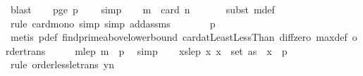 \begin{isabellebody}
\ blast\isanewline
\ \ \isamarkupfalse%
\ p{\isacharunderscore}{\kern0pt}ge{\isacharunderscore}{\kern0pt}{}{\isacharcolon}{\kern0pt}\ {\isachardoublequoteopen}p\ {\isachargreater}{\kern0pt}\ {}{\isachardoublequoteclose}\ \isamarkupfalse%
\ simp\isanewline
\isanewline
\ \ \isamarkupfalse%
\ {\isachardoublequoteopen}m\ {\isasymle}\ card\ {\isacharbraceleft}{\kern0pt}{}{\isachardot}{\kern0pt}{\isachardot}{\kern0pt}{\isacharless}{\kern0pt}n{\isacharbraceright}{\kern0pt}{\isachardoublequoteclose}\ \isanewline
\ \ \ \ \isamarkupfalse%
\ {\isacharparenleft}{\kern0pt}subst\ m{\isacharunderscore}{\kern0pt}def{\isacharparenright}{\kern0pt}\isanewline
\ \ \ \ \isamarkupfalse%
\ {\isacharparenleft}{\kern0pt}rule\ card{\isacharunderscore}{\kern0pt}mono{\isacharcomma}{\kern0pt}\ simp{\isacharcomma}{\kern0pt}\ simp\ add{\isacharcolon}{\kern0pt}assms{\isacharparenleft}{\kern0pt}{}{\isacharparenright}{\kern0pt}{\isacharparenright}{\kern0pt}\isanewline
\ \ \isamarkupfalse%
\ \isamarkupfalse%
\ {\isachardoublequoteopen}{\isachardot}{\kern0pt}{\isachardot}{\kern0pt}{\isachardot}{\kern0pt}\ {\isasymle}\ p{\isachardoublequoteclose}\isanewline
\ \ \ \ \isamarkupfalse%
\ {\isacharparenleft}{\kern0pt}metis\ p{\isacharunderscore}{\kern0pt}def\ find{\isacharunderscore}{\kern0pt}prime{\isacharunderscore}{\kern0pt}above{\isacharunderscore}{\kern0pt}lower{\isacharunderscore}{\kern0pt}bound\ card{\isacharunderscore}{\kern0pt}atLeastLessThan\ diff{\isacharunderscore}{\kern0pt}zero\ max{\isacharunderscore}{\kern0pt}def\ order{\isacharunderscore}{\kern0pt}trans{\isacharparenright}{\kern0pt}\isanewline
\ \ \isamarkupfalse%
\ \isamarkupfalse%
\ m{\isacharunderscore}{\kern0pt}le{\isacharunderscore}{\kern0pt}p{\isacharcolon}{\kern0pt}\ {\isachardoublequoteopen}m\ {\isasymle}\ p{\isachardoublequoteclose}\ \isamarkupfalse%
\ simp\isanewline
\isanewline
\ \ \isamarkupfalse%
\ xs{\isacharunderscore}{\kern0pt}le{\isacharunderscore}{\kern0pt}p{\isacharcolon}{\kern0pt}\ {\isachardoublequoteopen}{\isasymAnd}x{\isachardot}{\kern0pt}\ x\ {\isasymin}\ set\ as\ {\isasymLongrightarrow}\ x\ {\isacharless}{\kern0pt}\ p{\isachardoublequoteclose}\ \isanewline
\ \ \ \ \isamarkupfalse%
\ {\isacharparenleft}{\kern0pt}rule\ order{\isacharunderscore}{\kern0pt}less{\isacharunderscore}{\kern0pt}le{\isacharunderscore}{\kern0pt}trans{\isacharbrackleft}{\kern0pt}\ y{\isacharequal}{\kern0pt}{\isachardoublequoteopen}n{\isachardoublequoteclose}{\isacharbrackright}{\kern0pt}{\isacharparenright}{\kern0pt}\isanewline

\end{isabellebody}

